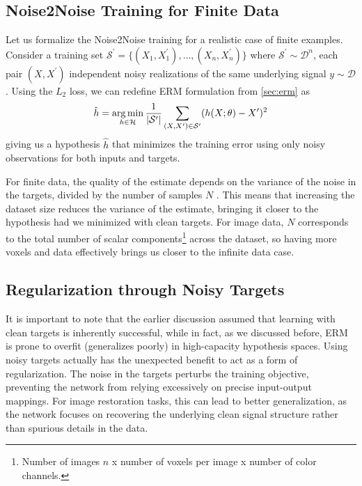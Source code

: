 \subsection{Noise2Noise Training for Finite Data}
Let us formalize the Noise2Noise training for a realistic case of finite examples. Consider a training set $\mathcal{S}^\prime = \{(X_1, X_1^\prime), \dots, (X_n, X_n^\prime)\}$ where $\mathcal{S}^\prime \sim \mathcal{D}^n$, each pair $(X, X^\prime)$ independent noisy realizations of the same underlying signal $y \sim \mathcal{D}$. Using the $L_2$ loss, we can redefine \gls{ERM} formulation from \cref{sec:erm} as
\begin{equation}\label{eq:erm-noise2noise}
    \hat{h} = \operatorname*{arg\,min}_{h \in \mathcal{H}} \frac{1}{\lvert \mathcal{S^\prime} \rvert} \sum_{(X, X^\prime) \in \mathcal{S}^\prime} (h(X; \theta) - X^\prime)^2
\end{equation}
giving us a hypothesis $\hat{h}$ that minimizes the training error using only noisy observations for both inputs and targets.

For finite data, the quality of the estimate depends on the variance of the noise in the targets, divided by the number of samples $N$ \cite[supplementary~material]{lehtinenNoise2NoiseLearningImage2018}. This means that increasing the dataset size reduces the variance of the estimate, bringing it closer to the hypothesis had we minimized with clean targets. For image data, $N$ corresponds to the total number of scalar components\footnote{Number of images $n$ x number of voxels per image x number of color channels.} across the dataset, so having more voxels and data effectively brings us closer to the infinite data case.

\subsection{Regularization through Noisy Targets}
It is important to note that the earlier discussion assumed that learning with clean targets is inherently successful, while in fact, as we discussed before, \gls{ERM} is prone to overfit (generalizes poorly) in high-capacity hypothesis spaces. Using noisy targets actually has the unexpected benefit to act as a form of regularization. The noise in the targets perturbs the training objective, preventing the network from relying excessively on precise input-output mappings. For image restoration tasks, this can lead to better generalization, as the network focuses on recovering the underlying clean signal structure rather than spurious details in the data.

